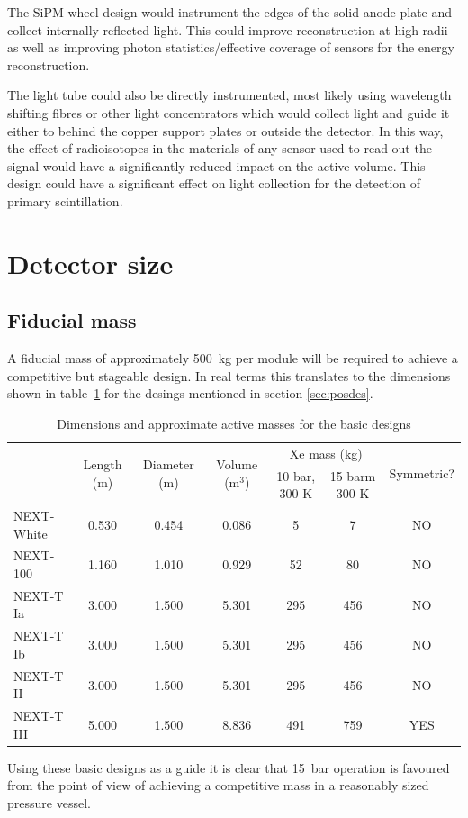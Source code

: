 \documentclass[11pt,a4paper]{article}
\begin{document}
The SiPM-wheel design would instrument the edges of the solid anode plate and collect internally reflected light. This could improve reconstruction at high radii as well as improving photon statistics/effective coverage of sensors for the energy reconstruction.

The light tube could also be directly instrumented, most likely using wavelength shifting fibres or other light concentrators which would collect light and guide it either to behind the copper support plates or outside the detector. In this way, the effect of radioisotopes in the materials of any sensor used to read out the signal would have a significantly reduced impact on the active volume. This design could have a significant effect on light collection for the detection of primary scintillation.

\section{Detector size}
\label{sec:size}

\subsection{Fiducial mass}
\label{subSec:fidmass}
A fiducial mass of approximately 500~kg per module will be required to achieve a competitive but stageable design. In real terms this translates to the dimensions shown in table~\ref{tab:mass} for the desings mentioned in section \ref{sec:posdes}.
\begin{table}
  \begin{center}
    \begin{tabular}{|l|c|c|c|c|c|c|}
      \hline
      \multirow{2}{*}{} & \multirow{2}{*}{Length (m)} & \multirow{2}{*}{Diameter (m)} & \multirow{2}{*}{Volume (m$^3$)} & \multicolumn{2}{c|}{Xe mass (kg)} & \multirow{2}{*}{Symmetric?} \\
      \cline{5-6}
                        & & & & 10 bar, 300 K & 15 barm 300 K & \\
      \hline
      NEXT-White & 0.530 & 0.454 & 0.086 &     5 &     7 &  NO \\
      NEXT-100    & 1.160 & 1.010 & 0.929 &   52 &   80 &  NO \\
      NEXT-T Ia    & 3.000 & 1.500 & 5.301 & 295 & 456 &  NO \\
      NEXT-T Ib    & 3.000 & 1.500 & 5.301 & 295 & 456 &  NO \\
      NEXT-T II     & 3.000 & 1.500 & 5.301 & 295 & 456 &  NO \\
      NEXT-T III    & 5.000 & 1.500 & 8.836 & 491 & 759 & YES \\
    \hline
    \end{tabular}
  \end{center}
  \caption{\label{tab:mass} Dimensions and approximate active masses for the basic designs}
\end{table}
Using these basic designs as a guide it is clear that 15~bar operation is favoured from the point of view of achieving a competitive mass in a reasonably sized pressure vessel. 
\end{document}
